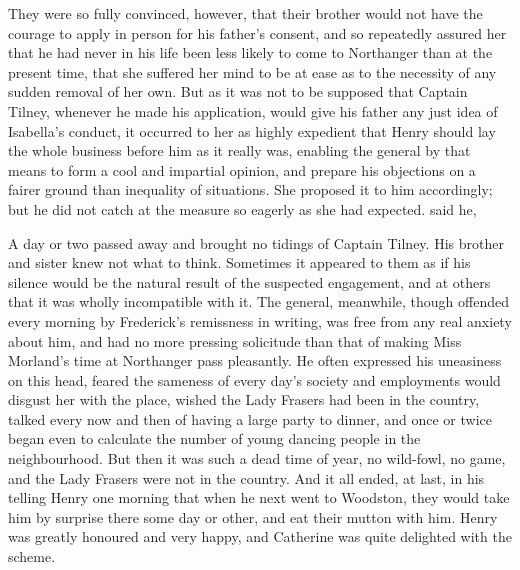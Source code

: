 They were so fully convinced, however, that their brother would not have the courage to apply in person for his father's consent, and so repeatedly assured her that he had never in his life been less likely to come to Northanger than at the present time, that she suffered her mind to be at ease as to the necessity of any sudden removal of her own. But as it was not to be supposed that Captain Tilney, whenever he made his application, would give his father any just idea of Isabella's conduct, it occurred to her as highly expedient that Henry should lay the whole business before him as it really was, enabling the general by that means to form a cool and impartial opinion, and prepare his objections on a fairer ground than inequality of situations. She proposed it to him accordingly; but he did not catch at the measure so eagerly as she had expected.  said he, 



A day or two passed away and brought no tidings of Captain Tilney. His brother and sister knew not what to think. Sometimes it appeared to them as if his silence would be the natural result of the suspected engagement, and at others that it was wholly incompatible with it. The general, meanwhile, though offended every morning by Frederick's remissness in writing, was free from any real anxiety about him, and had no more pressing solicitude than that of making Miss Morland's time at Northanger pass pleasantly. He often expressed his uneasiness on this head, feared the sameness of every day's society and employments would disgust her with the place, wished the Lady Frasers had been in the country, talked every now and then of having a large party to dinner, and once or twice began even to calculate the number of young dancing people in the neighbourhood. But then it was such a dead time of year, no wild-fowl, no game, and the Lady Frasers were not in the country. And it all ended, at last, in his telling Henry one morning that when he next went to Woodston, they would take him by surprise there some day or other, and eat their mutton with him. Henry was greatly honoured and very happy, and Catherine was quite delighted with the scheme. 

